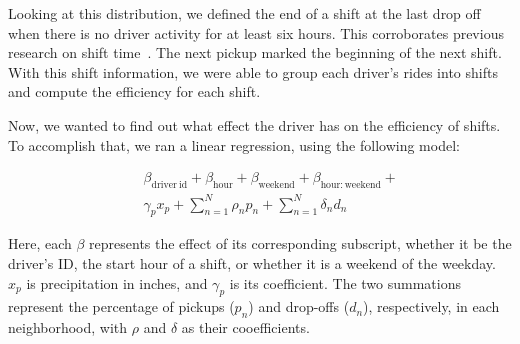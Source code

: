 \documentclass[twocolumn]{article}
\begin{document}
Looking at this distribution, we defined the end of a shift at the last drop off when there is no driver activity for at least six hours. This corroborates previous research on shift time~\cite{Farber:2014}. The next pickup marked the beginning of the next shift. With this shift information, we were able to group each driver's rides into shifts and compute the efficiency for each shift.

Now, we wanted to find out what effect the driver has on the efficiency of shifts. To accomplish that, we ran a linear regression, using the following model: 

\begin{eqnarray*}
&& \beta_{\mathrm{driver~id}} + \beta_{\mathrm{hour}} + \beta_{\mathrm{weekend}} + \beta_{\mathrm{hour:weekend}} + \\
  & & \gamma_p x_p + \sum_{n=1}^N \rho_n p_n + \sum_{n=1}^N \delta_n d_n
\end{eqnarray*}

Here, each $\beta$ represents the effect of its corresponding subscript, whether it be the driver’s ID, the start hour of a shift, or whether it is a weekend of the weekday. $x_p$ is precipitation in inches, and  $\gamma_p$ is its coefficient. The two summations represent the percentage of pickups ($p_n$) and drop-offs ($d_n$), respectively, in each neighborhood, with $\rho$ and $\delta$ as their cooefficients.
\end{document}
